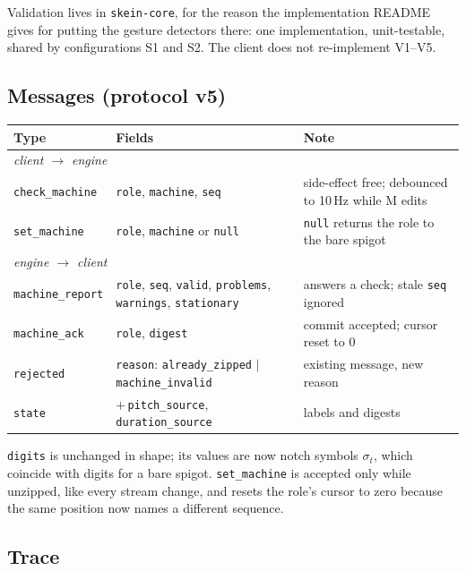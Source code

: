 \documentclass[11pt,a4paper]{article}
\theoremstyle{definition}
\theoremstyle{plain}
\theoremstyle{remark}
\begin{document}
Validation lives in \texttt{skein-core}, for the reason the implementation README gives for putting
the gesture detectors there: one implementation, unit-testable, shared by configurations S1 and S2.
The client does not re-implement V1--V5.

\subsection{Messages (protocol v5)}

\begin{center}
\begin{tabular}{l>{\raggedright\arraybackslash}p{5.2cm}>{\raggedright\arraybackslash}p{5.2cm}}
\toprule
\textbf{Type} & \textbf{Fields} & \textbf{Note} \\
\midrule
\multicolumn{3}{l}{\emph{client $\to$ engine}}\\
\texttt{check\_machine} & \texttt{role}, \texttt{machine}, \texttt{seq} &
  side-effect free; debounced to 10\,Hz while M edits \\
\texttt{set\_machine} & \texttt{role}, \texttt{machine} or \texttt{null} &
  \texttt{null} returns the role to the bare spigot \\
\midrule
\multicolumn{3}{l}{\emph{engine $\to$ client}}\\
\texttt{machine\_report} & \texttt{role}, \texttt{seq}, \texttt{valid}, \texttt{problems},
  \texttt{warnings}, \texttt{stationary} & answers a check; stale \texttt{seq} ignored \\
\texttt{machine\_ack} & \texttt{role}, \texttt{digest} & commit accepted; cursor reset to 0 \\
\texttt{rejected} & \texttt{reason}: \texttt{already\_zipped} $|$ \texttt{machine\_invalid} & existing message, new reason \\
\texttt{state} & $+$\,\texttt{pitch\_source}, \texttt{duration\_source} & labels and digests \\
\bottomrule
\end{tabular}
\end{center}

\texttt{digits} is unchanged in shape; its values are now notch symbols $\sigma_t$, which coincide
with digits for a bare spigot. \texttt{set\_machine} is accepted only while unzipped, like every
stream change, and resets the role's cursor to zero because the same position now names a different
sequence.

\subsection{Trace}
\end{document}
